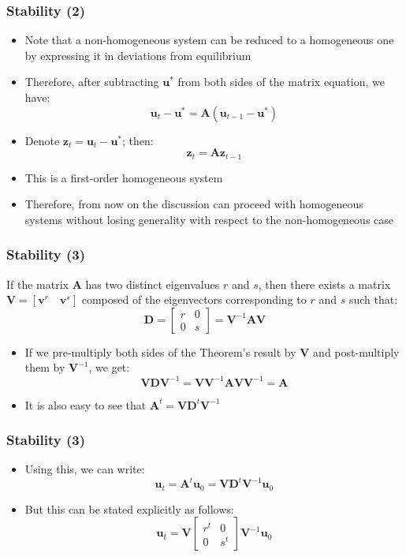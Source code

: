\documentclass[10pt,usenames,dvipsnames]{beamer}
\theoremstyle{definition}
\begin{document}
\begin{frame}[fragile]
\frametitle{Stability (2)}
\begin{itemize}
	\item Note that a non-homogeneous system can be reduced to a homogeneous one by expressing it in deviations from equilibrium
	\item Therefore, after subtracting $\mathbf{u}^{*}$ from both sides of the matrix equation, we have:
	\[
		\mathbf{u}_{t} - \mathbf{u}^{*}  = \mathbf{A}(\mathbf{u}_{t-1} - \mathbf{u}^{*})
	\]
	\item Denote $\mathbf{z}_{t} = \mathbf{u}_{t} - \mathbf{u}^{*}$; then:
	\[
		\mathbf{z}_{t}  = \mathbf{A}\mathbf{z}_{t-1}
	\]
	\item This is a first-order homogeneous system
	\item Therefore, from now on the discussion can proceed with homogeneous systems without losing generality with respect to the non-homogeneous case
\end{itemize}
\end{frame}

\begin{frame}[fragile]
\frametitle{Stability (3)}
\begin{theorem}
	If the matrix $ \mathbf{A} $ has two distinct eigenvalues $r$ and $s$, then there exists a matrix $ \mathbf{V} = [\mathbf{v}^{r} \quad \mathbf{v}^{s}]$ composed of the eigenvectors corresponding to $r$ and $s$ such that:
	\[
		\mathbf{D} = 
		\left[\begin{matrix}
			r & 0\\
			0 & s
		\end{matrix}\right] = 
		\mathbf{V}^{-1}\mathbf{AV}
	\]
\end{theorem}
\begin{itemize}
	\item If we pre-multiply both sides of the Theorem's result by $\mathbf{V}$ and post-multiply them by $\mathbf{V}^{-1}$, we get:
	\[
		\mathbf{V}\mathbf{D}\mathbf{V}^{-1} = \mathbf{V}\mathbf{V}^{-1}\mathbf{AV}\mathbf{V}^{-1} = \mathbf{A}
	\]
	\item It is also easy to see that $\mathbf{A}^{t} = \mathbf{V}\mathbf{D}^{t}\mathbf{V}^{-1}$
\end{itemize}
\end{frame}

\begin{frame}[fragile]
\frametitle{Stability (3)}
\begin{itemize}
	\item Using this, we can write:
	\[
		\mathbf{u}_{t} = \mathbf{A}^{t}\mathbf{u}_{0} = \mathbf{V}\mathbf{D}^{t}\mathbf{V}^{-1}\mathbf{u}_{0}
	\]
	\item But this can be stated explicitly as follows:
	\[
		\mathbf{u}_{t} = \mathbf{V}
		\left[\begin{matrix}
			r^{t} & 0\\
			0 & s^{t}
		\end{matrix}\right]		
		\mathbf{V}^{-1}\mathbf{u}_{0}
	\]
\end{itemize}
\end{frame}
\end{document}
